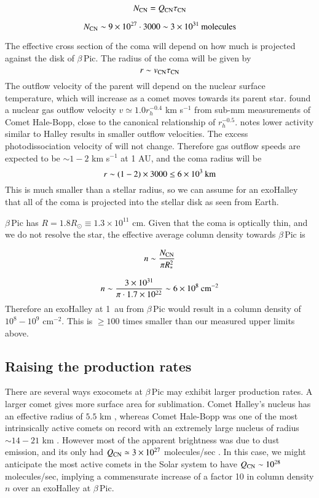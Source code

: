 \documentclass{aa}
\newcommand{\kms}{km s$^{-1}$}
\newcommand{\bp}{$\beta$\,Pic}
\begin{document}
$$N_{\ce{CN}}=Q_{\ce{CN}} \tau_{\ce{CN}}$$

$$N_{\ce{CN}}\sim 9\times10^{27} \cdot  3000 \sim 3\times10^{31}\:{\rm molecules}$$

The effective cross section of the coma will depend on how much is projected against the disk of \bp{}.
%
The radius of the  coma will be given by
$$r\sim v_{\ce{CN}} \tau_{\ce{CN}}$$
The outflow velocity of the parent  will depend on the nuclear surface temperature, which will increase as a comet moves towards its parent star.
%
\citet{Biver2002} found a nuclear gas outflow velocity $v\simeq1.0  r_h^{-0.4}$ \kms{} from sub-mm measurements of Comet Hale-Bopp, close to the canonical relationship of $r_h^{-0.5}$.
%
\citet{Harris2002} notes lower activity similar to Halley results in smaller outflow velocities.
%
The excess photodissociation velocity of  will not change.
%
Therefore gas outflow speeds are expected to be $\sim 1-2$ \kms{} at 1 AU, and the  coma radius will be
%
$$r\sim (1-2) \times 3000 \leq 6\times 10^{3}\:{\rm km}$$
%
This is much smaller than a stellar radius, so we can assume for an exoHalley that all of the coma is projected into the stellar disk as seen from Earth.

\bp{} has $R=1.8R_\odot\equiv 1.3\times 10^{11}$ cm.
%
Given that the coma is optically thin, and we do not resolve the star, the effective average column density towards \bp{} is 

$$n\sim\frac{N_{\ce{CN}}}{\pi R_*^2}$$

$$n\sim\frac{3\times10^{31}}{\pi\cdot 1.7\times10^{22}}\sim 6\times10^{8}\:{\rm cm^{-2}}$$
Therefore an exoHalley at 1~au from \bp{} would result in a  column density of $10^{8}-10^{9}$ cm$^{-2}$.
%
This is $\geq100$ times smaller than our measured upper limits above.

\subsection{Raising the \texorpdfstring{}{CN} production rates}

There are several ways exocomets at \bp{} may exhibit larger  production rates.
%
A larger comet gives more surface area for sublimation.
%
 Comet Halley's nucleus has an effective radius of $5.5$ km \citep{Keller1987}, whereas Comet Hale-Bopp was one of the most intrinsically active comets on record with an extremely large nucleus of radius $\sim 14-21$ km \citep{Weaver1997}.
%
However most of the apparent brightness was due to dust emission, and its only had $Q_{\ce{CN}}\simeq 3\times10^{27}$ molecules/sec \citep{Schleicher2024}.
%
In this case, we might anticipate the most active comets in the Solar system to have $Q_{\ce{CN}}\sim 10^{28}$ molecules/sec, implying a commensurate increase of a factor 10 in column density $n$ over an exoHalley at \bp{}.
\end{document}
